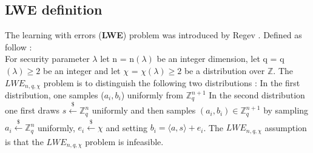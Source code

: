 \subsection{LWE definition}
The learning with errors (\textbf{LWE}) problem was introduced by Regev \cite{LWE}. Defined as follow :\\
For security parameter $\lambda$ let n = n$(\lambda)$ be an integer dimension, let q = q$(\lambda)\geq 2$ be an integer and let $\chi$ = $\chi(\lambda)\geq 2$ be a distribution over $\mathbb{Z}$. The $LWE_{n,q,\chi}$ problem is to distinguish the following two distributions : 
\tabNormal In the first distribution, one samples ($a_i, b_i$) uniformly from $\mathbb{Z}_q^{n+1}$
\tabNormal In the second distribution one first draws $s \xleftarrow[]{\$}\mathbb{Z}_q^n$ uniformly and then samples $(a_i, b_i) \in \mathbb{Z}_q^{n+1}$ by sampling $a_i \xleftarrow[]{\$}\mathbb{Z}_q^n$ uniformly, $e_i \xleftarrow[]{\$}\chi$ and setting $b_i = \langle a,s \rangle + e_i$. The $LWE_{n,q,\chi}$ assumption is that the $LWE_{n,q,\chi}$ problem is infeasible.